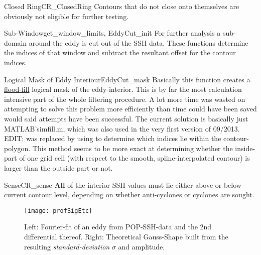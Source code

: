 \begin{filter}{Closed Ring}{CR_ClosedRing}
Contours that do not close onto themselves are obviously not eligible for
further testing.
\end{filter}\newline
\begin{filter}{Sub-Window}{get_window_limits, EddyCut_init}
For further analysis a sub-domain around the eddy is cut out of the SSH data.
These functions determine the indices of that window and subtract the
resultant offset for the contour indices.
\end{filter}\newline
\begin{filter}{Logical Mask of Eddy Interiour}{EddyCut_mask}
\label{filter:cutmask}
Basically this function creates a \href{http://en.wikipedia.org/wiki/Flood_fill}{flood-fill} logical mask of the
eddy-interior. This is by far the most calculation intensive part of the whole
filtering procedure. A lot more time was wasted on attempting to solve this
problem more efficiently than time could have been saved would said attempts
have
been successful. The current solution is basically just MATLAB's{imfill.m}, which was also used in the very first version of 09/2013.
EDIT:  was replaced by using  to determine which indices lie within the contour-polygon. This method seems to be more exact at determining whether the inside-part of one grid cell (with respect to the smooth, spline-interpolated contour) is larger than the outside part or not.
\end{filter}\newline
\begin{filter}{Sense}{CR_sense}
\textbf{All} of the interior SSH values must lie either above or below current
contour level, depending on whether anti-cyclones or cyclones are sought.
\end{filter}\newline
\begin{figure}
	\texttt{[image: profSigEtc]}
	\caption{Left: Fourier-fit of an eddy from POP-SSH-data and the 2nd differential thereof. Right: Theoretical Gauss-Shape built from the resulting \textit{standard-deviation} \ie $\sigma$ and amplitude.}
	\label{fig:profSigEtc}
\end{figure}
